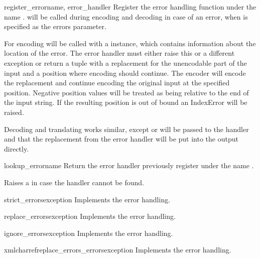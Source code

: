 \begin{funcdesc}{register_error}{name, error_handler}
Register the error handling function  under the
name .  will be called during encoding
and decoding in case of an error, when  is specified as the
errors parameter.

For encoding  will be called with a
 instance, which contains information about
the location of the error. The error handler must either raise this or
a different exception or return a tuple with a replacement for the
unencodable part of the input and a position where encoding should
continue. The encoder will encode the replacement and continue encoding
the original input at the specified position. Negative position values
will be treated as being relative to the end of the input string. If the
resulting position is out of bound an IndexError will be raised.

Decoding and translating works similar, except 
or  will be passed to the handler and
that the replacement from the error handler will be put into the output
directly.
\end{funcdesc}

\begin{funcdesc}{lookup_error}{name}
Return the error handler previously register under the name .

Raises a  in case the handler cannot be found.
\end{funcdesc}

\begin{funcdesc}{strict_errors}{exception}
Implements the  error handling.
\end{funcdesc}

\begin{funcdesc}{replace_errors}{exception}
Implements the  error handling.
\end{funcdesc}

\begin{funcdesc}{ignore_errors}{exception}
Implements the  error handling.
\end{funcdesc}

\begin{funcdesc}{xmlcharrefreplace_errors_errors}{exception}
Implements the  error handling.
\end{funcdesc}

